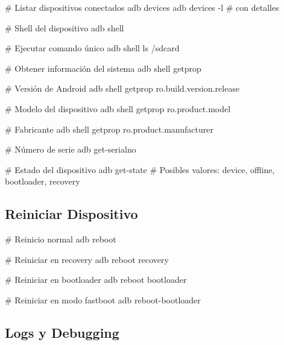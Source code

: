 \documentclass[
  doc,
  floatsintext,
  longtable,
  a4paper,
  nolmodern,
  notxfonts,
  notimes,
  12pt,
  colorlinks=true,linkcolor=blue,citecolor=blue,urlcolor=blue]{apa7}
\newenvironment{Shaded}{\begin{snugshade}}{\end{snugshade}}
\newcommand{\AttributeTok}[1]{\textcolor[rgb]{0.40,0.45,0.13}{#1}}
\newcommand{\CommentTok}[1]{\textcolor[rgb]{0.37,0.37,0.37}{#1}}
\newcommand{\ExtensionTok}[1]{\textcolor[rgb]{0.00,0.23,0.31}{#1}}
\newcommand{\NormalTok}[1]{\textcolor[rgb]{0.00,0.23,0.31}{#1}}
\begin{document}
\begin{Shaded}
\begin{Highlighting}[]
\CommentTok{\# Listar dispositivos conectados}
\ExtensionTok{adb}\NormalTok{ devices}
\ExtensionTok{adb}\NormalTok{ devices }\AttributeTok{{-}l}  \CommentTok{\# con detalles}

\CommentTok{\# Shell del dispositivo}
\ExtensionTok{adb}\NormalTok{ shell}

\CommentTok{\# Ejecutar comando único}
\ExtensionTok{adb}\NormalTok{ shell ls /sdcard}

\CommentTok{\# Obtener información del sistema}
\ExtensionTok{adb}\NormalTok{ shell getprop}

\CommentTok{\# Versión de Android}
\ExtensionTok{adb}\NormalTok{ shell getprop ro.build.version.release}

\CommentTok{\# Modelo del dispositivo}
\ExtensionTok{adb}\NormalTok{ shell getprop ro.product.model}

\CommentTok{\# Fabricante}
\ExtensionTok{adb}\NormalTok{ shell getprop ro.product.manufacturer}

\CommentTok{\# Número de serie}
\ExtensionTok{adb}\NormalTok{ get{-}serialno}

\CommentTok{\# Estado del dispositivo}
\ExtensionTok{adb}\NormalTok{ get{-}state}
\CommentTok{\# Posibles valores: device, offline, bootloader, recovery}
\end{Highlighting}
\end{Shaded}

\subsection{Reiniciar Dispositivo}\label{reiniciar-dispositivo}

\begin{Shaded}
\begin{Highlighting}[]
\CommentTok{\# Reinicio normal}
\ExtensionTok{adb}\NormalTok{ reboot}

\CommentTok{\# Reiniciar en recovery}
\ExtensionTok{adb}\NormalTok{ reboot recovery}

\CommentTok{\# Reiniciar en bootloader}
\ExtensionTok{adb}\NormalTok{ reboot bootloader}

\CommentTok{\# Reiniciar en modo fastboot}
\ExtensionTok{adb}\NormalTok{ reboot{-}bootloader}
\end{Highlighting}
\end{Shaded}

\subsection{Logs y Debugging}\label{logs-y-debugging}
\end{document}
